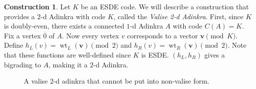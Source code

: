 \documentclass[12pt,twoside,singlespace]{article}
\numberwithin{equation}{section}
\theoremstyle{definition}
\newtheorem{construction}[equation]{Construction}
\newcommand{\on}{\operatorname}
\newcommand{\wt}{\on{wt}}
\renewcommand{\vec}[1]{\mathbf{#1}}
\begin{document}
\begin{construction}
\label{cons:valise}
Let $K$ be an ESDE code.  We will describe a construction that provides a $2$-d Adinkra with code $K$, called the {\em Valise 2-d Adinkra}. First, since $K$ is doubly-even, there exists a connected $1$-d Adinkra $A$ with code $C(A) = K$.\cite{d2l:omni,d2l:topology}  Fix a vertex $\overline{0}$ of $A$. Now every vertex $v$ corresponds to a vector $\vec{v} \pmod{K}$. Define $h_L(v) = \wt_L(\vec{v}) \pmod{2}$ and $h_R(v) = \wt_R(\vec{v}) \pmod{2}$. Note that these functions are well-defined since $K$ is ESDE. $(h_L, h_R)$ gives a bigrading to $A$, making it a $2$-d Adinkra. %
\end{construction}

\begin{figure}[htb]
\begin{center}

\caption{A valise $2$-d adinkra that cannot be put into non-valise form.\label{fig:tight valise}}
\end{center}
\end{figure}
\end{document}
